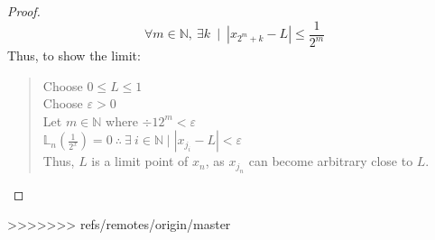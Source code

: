 \begin{proof}
    $$∀m∈ℕ,\ ∃k\ ∣\ \left|x_{2^m+k}-L\right|\le\frac{1}{2^{m}}$$
    Thus, to show the limit:
    \begin{quote}
        Choose $0≤L≤1$ \\
        Choose $ε>0$ \\
        Let $m∈ℕ$ where $÷{1}{2^m}<ε$ \\
        $𝕃_{n}\left(\frac{1}{2^{x}}\right)=0\ ∴\ ∃\ i∈ℕ ∣ \left|x_{j_i}-L\right|<ε$ \\
        Thus, $L$ is a limit point of $x_n$, as $x_{j_n}$ can become arbitrary close to $L$.
    \end{quote}
\end{proof}
>>>>>>> refs/remotes/origin/master
